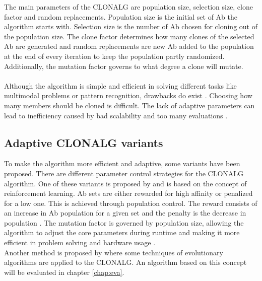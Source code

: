 The main parameters of the CLONALG are population size, selection size, clone factor and random replacements. Population size is the initial set of Ab the algorithm starts with. Selection size is the number of Ab chosen for cloning out of the population size. The clone factor determines how many clones of the selected Ab are generated and random replacements are new Ab added to the population at the end of every iteration to keep the population partly randomized. Additionally, the mutation factor governs to what degree a clone will mutate.\\\\
Although the algorithm is simple and efficient in solving different tasks like multimodal problems or pattern recognition, drawbacks do exist \cite{Garret04}. Choosing how many members should be cloned is difficult. The lack of adaptive parameters can lead to inefficiency caused by bad scalability and too many evaluations \cite{Garret04}.
\subsection{Adaptive CLONALG variants}
To make the algorithm more efficient and adaptive, some variants have been proposed. There are different parameter control strategies for the CLONALG algorithm. One of these variants is proposed by \cite{RIFF09} and is based on the concept of reinforcement learning. Ab sets are either rewarded for high affinity or penalized for a low one. This is achieved through population control. The reward consists of an increase in Ab population for a given set and the penalty is the decrease in population \cite{RIFF09}. The mutation factor is governed by population size, allowing the algorithm to adjust the core parameters during runtime and making it more efficient in problem solving and hardware usage \cite{RIFF09}.\\
Another method is proposed by \cite{Garret04} where some techniques of evolutionary algorithms are applied to the CLONALG. An algorithm based on this concept will be evaluated in chapter \ref{chap:eva}.
 




